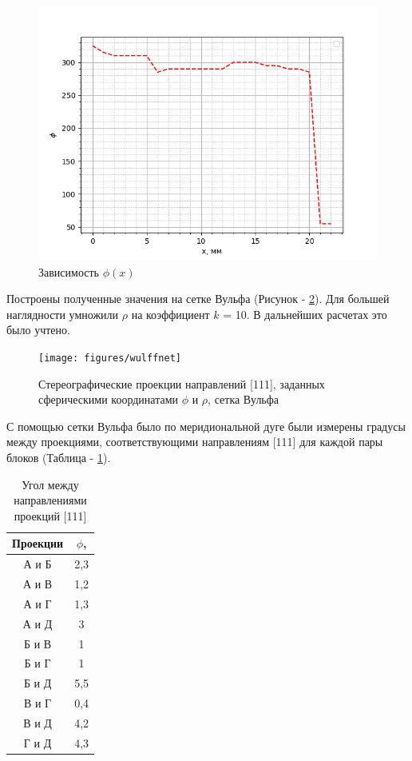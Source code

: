 \begin{figure}[H]
        \centering
        \includegraphics[width=0.7\columnwidth]{figures/phix}%
        \caption{Зависимость $\phi(x)$}
		\label{fig:phix}
\end{figure}

Построены полученные значения на сетке Вульфа (Рисунок - \ref{fig:wulffnet}).
Для большей наглядности умножили $\rho$ на коэффициент $k$ = 10.
В дальнейших расчетах это было учтено.

\begin{figure}[H]
        \centering
        \texttt{[image: figures/wulffnet]}%
        \caption{Стереографические проекции направлений [111], заданных сферическими координатами $\phi$ и $\rho$, сетка Вульфа}
		\label{fig:wulffnet}
\end{figure}

С помощью сетки Вульфа было по меридиональной дуге были измерены градусы между проекциями,
соответствующими направлениям [111] для каждой пары блоков (Таблица - \ref{tab:angel}).

\begin{table}[H]
    \centering
	\begin{threeparttable}%
    \caption{Угол между направлениями проекций [111]}\label{tab:angel}
    \begin{tabular}{|c|c|}
        \hline
		Проекции & $\phi$, \degree  \\ \hline
		А и Б & 2,3 \\ \hline
		А и В & 1,2 \\ \hline
		А и Г & 1,3 \\ \hline
		А и Д & 3   \\ \hline
		Б и В & 1   \\ \hline
		Б и Г & 1   \\ \hline
		Б и Д & 5,5 \\ \hline
		В и Г & 0,4 \\ \hline
		В и Д & 4,2 \\ \hline
		Г и Д & 4,3 \\ \hline
    \end{tabular}
	\end{threeparttable}
\end{table}


